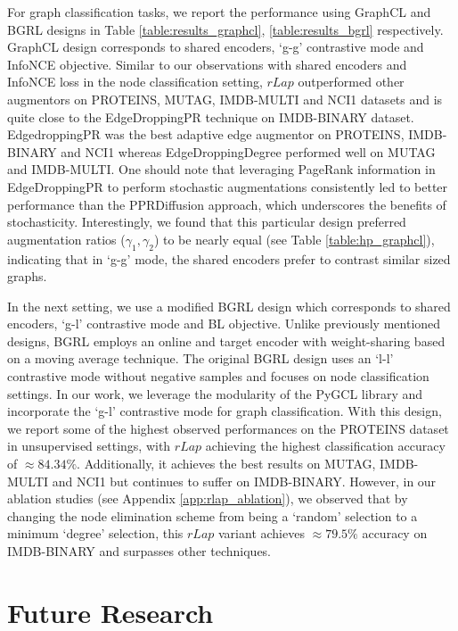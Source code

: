 \documentclass{article}
\theoremstyle{plain}
\theoremstyle{definition}
\theoremstyle{remark}
\begin{document}
For graph classification tasks, we report the performance using GraphCL and BGRL designs in Table \ref{table:results_graphcl}, \ref{table:results_bgrl} respectively. GraphCL design corresponds to shared encoders, `g-g' contrastive mode and InfoNCE objective. Similar to our observations with shared encoders and InfoNCE loss in the node classification setting, $rLap$ outperformed other augmentors on PROTEINS, MUTAG, IMDB-MULTI and NCI1 datasets and is quite close to the EdgeDroppingPR technique on IMDB-BINARY dataset. EdgedroppingPR was the best adaptive edge augmentor on PROTEINS, IMDB-BINARY and NCI1 whereas EdgeDroppingDegree performed well on MUTAG and IMDB-MULTI. One should note that leveraging PageRank information in EdgeDroppingPR to perform stochastic augmentations consistently led to better performance than the PPRDiffusion approach, which underscores the benefits of stochasticity. Interestingly, we found that this particular design preferred augmentation ratios ($\gamma_1, \gamma_2$) to be nearly equal (see Table \ref{table:hp_graphcl}), indicating that in `g-g' mode, the shared encoders prefer to contrast similar sized graphs.

In the next setting, we use a modified BGRL design which corresponds to shared encoders, `g-l' contrastive mode and BL objective. Unlike previously mentioned designs, BGRL employs an online and target encoder with weight-sharing based on a moving average technique. The original BGRL design \citep{thakoor2021bootstrapped} uses an `l-l' contrastive mode without negative samples and focuses on node classification settings. In our work, we leverage the modularity of the PyGCL library and incorporate the `g-l' contrastive mode for graph classification. With this design, we report some of the highest observed performances on the PROTEINS dataset in unsupervised settings, with $rLap$ achieving the highest classification accuracy of $\approx 84.34 \%$. Additionally, it achieves the best results on MUTAG, IMDB-MULTI and NCI1 but continues to suffer on IMDB-BINARY. However, in our ablation studies (see Appendix \ref{app:rlap_ablation}), we observed that by changing the node elimination scheme from being a `random' selection to a minimum `degree' selection, this $rLap$ variant achieves $\approx 79.5\%$ accuracy on IMDB-BINARY and surpasses other techniques.

\section{Future Research}
\end{document}
